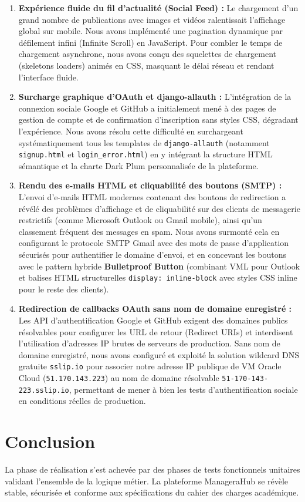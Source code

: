 \begin{enumerate}
    \item \textbf{Expérience fluide du fil d'actualité (Social Feed) :} Le chargement d'un grand nombre de publications avec images et vidéos ralentissait l'affichage global sur mobile. Nous avons implémenté une pagination dynamique par défilement infini (Infinite Scroll) en JavaScript. Pour combler le temps de chargement asynchrone, nous avons conçu des squelettes de chargement (skeletons loaders) animés en CSS, masquant le délai réseau et rendant l'interface fluide.
    \item \textbf{Surcharge graphique d'OAuth et django-allauth :} L'intégration de la connexion sociale Google et GitHub a initialement mené à des pages de gestion de compte et de confirmation d'inscription sans styles CSS, dégradant l'expérience. Nous avons résolu cette difficulté en surchargeant systématiquement tous les templates de \texttt{django-allauth} (notamment \texttt{signup.html} et \texttt{login\_error.html}) en y intégrant la structure HTML sémantique et la charte Dark Plum personnalisée de la plateforme.
    \item \textbf{Rendu des e-mails HTML et cliquabilité des boutons (SMTP) :} L'envoi d'e-mails HTML modernes contenant des boutons de redirection a révélé des problèmes d'affichage et de cliquabilité sur des clients de messagerie restrictifs (comme Microsoft Outlook ou Gmail mobile), ainsi qu'un classement fréquent des messages en spam. Nous avons surmonté cela en configurant le protocole SMTP Gmail avec des mots de passe d'application sécurisés pour authentifier le domaine d'envoi, et en concevant les boutons avec le pattern hybride \textbf{Bulletproof Button} (combinant VML pour Outlook et balises HTML structurelles \texttt{display: inline-block} avec styles CSS inline pour le reste des clients).
    \item \textbf{Redirection de callbacks OAuth sans nom de domaine enregistré :} Les API d'authentification Google et GitHub exigent des domaines publics résolvables pour configurer les URL de retour (Redirect URIs) et interdisent l'utilisation d'adresses IP brutes de serveurs de production. Sans nom de domaine enregistré, nous avons configuré et exploité la solution wildcard DNS gratuite \texttt{sslip.io} pour associer notre adresse IP publique de VM Oracle Cloud (\texttt{51.170.143.223}) au nom de domaine résolvable \texttt{51-170-143-223.sslip.io}, permettant de mener à bien les tests d'authentification sociale en conditions réelles de production.
\end{enumerate}

\section{Conclusion}
La phase de réalisation s'est achevée par des phases de tests fonctionnels unitaires validant l'ensemble de la logique métier. La plateforme ManageraHub se révèle stable, sécurisée et conforme aux spécifications du cahier des charges académique.
\newpage
